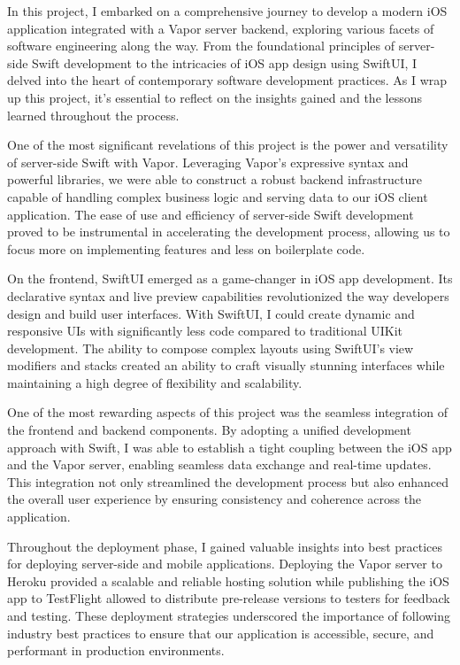 \documentclass[
  biblatex = false,
  language=english,
  figures=false,
  sourcecodes,
  glossaries,
  index
]{kidiplom}
\begin{document}
\begin{kiconclusions}

In this project, I embarked on a comprehensive journey to develop a modern iOS application integrated with a Vapor server backend, exploring various facets of software engineering along the way. From the foundational principles of server-side Swift development to the intricacies of iOS app design using SwiftUI, I delved into the heart of contemporary software development practices. As I wrap up this project, it's essential to reflect on the insights gained and the lessons learned throughout the process.

One of the most significant revelations of this project is the power and versatility of server-side Swift with Vapor. Leveraging Vapor's expressive syntax and powerful libraries, we were able to construct a robust backend infrastructure capable of handling complex business logic and serving data to our iOS client application. The ease of use and efficiency of server-side Swift development proved to be instrumental in accelerating the development process, allowing us to focus more on implementing features and less on boilerplate code.

On the frontend, SwiftUI emerged as a game-changer in iOS app development. Its declarative syntax and live preview capabilities revolutionized the way developers design and build user interfaces. With SwiftUI, I could create dynamic and responsive UIs with significantly less code compared to traditional UIKit development. The ability to compose complex layouts using SwiftUI's view modifiers and stacks created an ability to craft visually stunning interfaces while maintaining a high degree of flexibility and scalability.

One of the most rewarding aspects of this project was the seamless integration of the frontend and backend components. By adopting a unified development approach with Swift, I was able to establish a tight coupling between the iOS app and the Vapor server, enabling seamless data exchange and real-time updates. This integration not only streamlined the development process but also enhanced the overall user experience by ensuring consistency and coherence across the application.

Throughout the deployment phase, I gained valuable insights into best practices for deploying server-side and mobile applications. Deploying the Vapor server to Heroku provided a scalable and reliable hosting solution while publishing the iOS app to TestFlight allowed to distribute pre-release versions to testers for feedback and testing. These deployment strategies underscored the importance of following industry best practices to ensure that our application is accessible, secure, and performant in production environments.


\end{kiconclusions}
\end{document}
